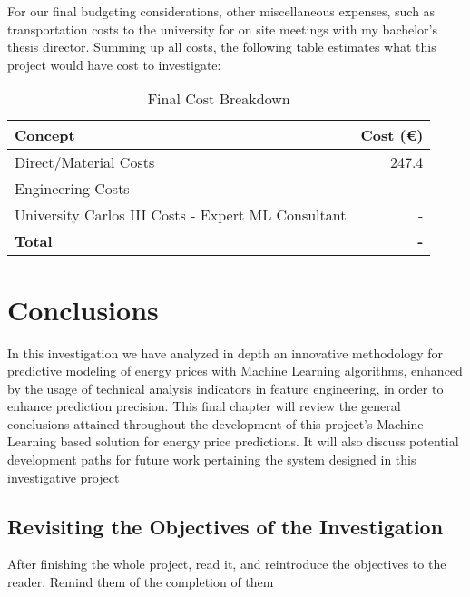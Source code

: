 \documentclass[12pt]{report} %
\begin{document}
For our final budgeting considerations, other miscellaneous expenses, such as transportation costs to the university for on site meetings with my bachelor's thesis director. Summing up all costs, the following table estimates what this project would have cost to investigate:

\begin{table}[H]
    \caption{Final Cost Breakdown}
    \centering
    \begin{tabular}{|l|r|}
        \hline
        \textbf{Concept} & \textbf{Cost (€)} \\
        \hline
        Direct/Material Costs & 247.4 \\
        Engineering Costs & - \\
        University Carlos III Costs - Expert ML Consultant & - \\
        \hline
        \textbf{Total} & \textbf{-} \\
        \hline
    \end{tabular}
\end{table}



\chapter{Conclusions}
In this investigation we have analyzed in depth an innovative methodology for predictive modeling of energy prices with Machine Learning algorithms, enhanced by the usage of technical analysis indicators in feature engineering, in order to enhance prediction precision. This final chapter will review the general conclusions attained throughout the development of this project's Machine Learning based solution for energy price predictions. It will also discuss potential development paths for future work pertaining the system designed in this investigative project



\section{Revisiting the Objectives of the Investigation} %
After finishing the whole project, read it, and reintroduce the objectives to the reader. Remind them of the completion of them
\end{document}
